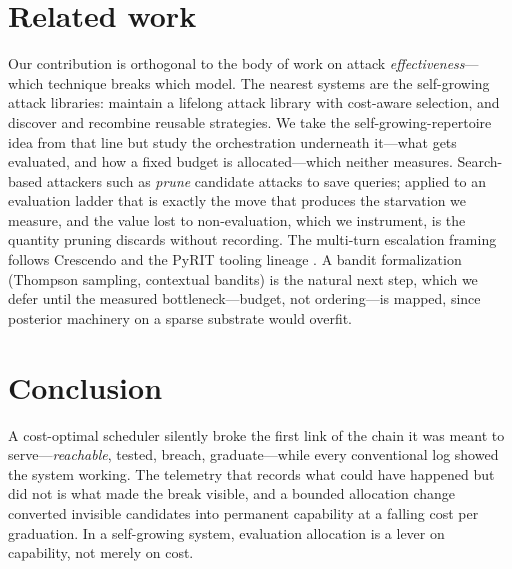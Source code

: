 \documentclass[11pt]{article}
\begin{document}
\section{Related work}

Our contribution is orthogonal to the body of work on attack \emph{effectiveness}---which technique breaks which model. The nearest systems are the self-growing attack libraries: \citet{zhou2025autoredteamer} maintain a lifelong attack library with cost-aware selection, and \citet{liu2025autodanturbo} discover and recombine reusable strategies. We take the self-growing-repertoire idea from that line but study the orchestration underneath it---what gets evaluated, and how a fixed budget is allocated---which neither measures. Search-based attackers such as \citet{mehrotra2024treeofattacks} \emph{prune} candidate attacks to save queries; applied to an evaluation ladder that is exactly the move that produces the starvation we measure, and the value lost to non-evaluation, which we instrument, is the quantity pruning discards without recording. The multi-turn escalation framing follows Crescendo \citep{russinovich2025crescendo} and the PyRIT tooling lineage \citep{lopezmunoz2024pyrit}. A bandit formalization (Thompson sampling, contextual bandits) is the natural next step, which we defer until the measured bottleneck---budget, not ordering---is mapped, since posterior machinery on a sparse substrate would overfit.

\section{Conclusion}

A cost-optimal scheduler silently broke the first link of the chain it was meant to serve---\emph{reachable}, tested, breach, graduate---while every conventional log showed the system working. The telemetry that records what could have happened but did not is what made the break visible, and a bounded allocation change converted invisible candidates into permanent capability at a falling cost per graduation. In a self-growing system, evaluation allocation is a lever on capability, not merely on cost.



\end{document}
